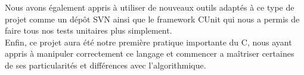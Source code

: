 	Nous avons également appris à utiliser de nouveaux outils adaptés à ce type de projet comme un dépôt SVN ainsi que le framework CUnit qui nous a permis de faire tous nos tests unitaires plus simplement.\\

	Enfin, ce projet aura été notre première pratique importante du C, nous ayant appris à manipuler correctement ce langage et commencer a maîtriser certaines de ses particularités et différences avec l'algorithmique.
